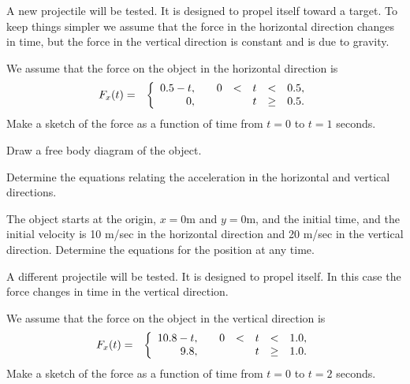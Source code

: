 \begin{problem}
\item A new projectile will be tested. It is designed to propel itself
  toward a target. To keep things simpler we assume that the force in
  the horizontal direction changes in time, but the force in the
  vertical direction is constant and is due to gravity.
  \begin{subproblem}
    \item We assume that the force on the object in the horizontal
      direction is 
      \begin{eqnarray*}
        F_x(t) & = & \left\{
                     \begin{array}{r@{\hspace{2em}}rcccl}
                       0.5-t, & 0 & < & t & < & 0.5, \\
                       0,     &   &   & t & \geq & 0.5.
                     \end{array}
                     \right.
      \end{eqnarray*}
      Make a sketch of the force as a function of time from $t=0$ to
      $t=1$ seconds. 
      \vfill

    \item Draw a free body diagram of the object.
      \vfill

    \item Determine the equations relating the acceleration in the
      horizontal and vertical directions.

      \vfill

      \clearpage

    \item The object starts at the origin, $x=0$m and $y=0$m, and the
      initial time, and the initial velocity is 10 m/sec in the
      horizontal direction and 20 m/sec in the vertical
      direction. Determine the equations for the position at any time.

      \vfill

  \end{subproblem}

  \clearpage

\item A different projectile will be tested. It is designed to propel
  itself. In this case the force changes in time in the vertical
  direction.
  \begin{subproblem}
    \item We assume that the force on the object in the vertical
      direction is 
      \begin{eqnarray*}
        F_x(t) & = & \left\{
                     \begin{array}{r@{\hspace{2em}}rcccl}
                       10.8-t, & 0 & < & t & < & 1.0, \\
                       9.8,     &   &   & t & \geq & 1.0.
                     \end{array}
                     \right.
      \end{eqnarray*}
      Make a sketch of the force as a function of time from $t=0$ to
      $t=2$ seconds. 
      \vfill


\end{subproblem}
\end{problem}
